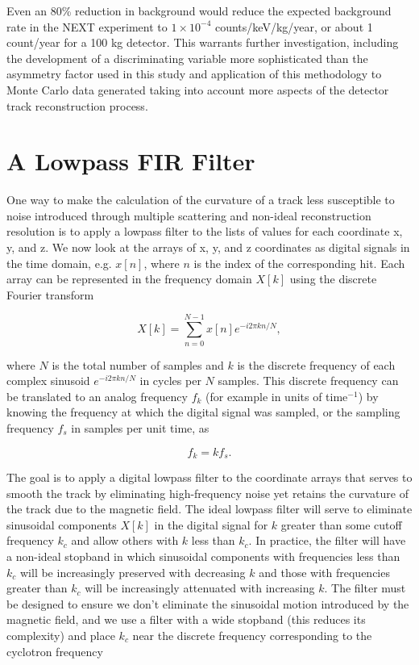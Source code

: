 \documentclass{JINST}
\begin{document}
Even an 80\% reduction in background would reduce the expected background rate in the NEXT experiment to
$1 \times 10^{-4}$ counts/keV/kg/year, or about 1 count/year for a 100 kg detector.  This warrants further
investigation, including the development of a discriminating variable more sophisticated than the asymmetry 
factor used in this study and application of this methodology to Monte Carlo data generated taking into account 
more aspects of the detector track reconstruction process.

\appendix

\section{A Lowpass FIR Filter}\label{app:FIR}
One way to make the calculation of the curvature of a track less susceptible to noise 
introduced through multiple scattering and non-ideal reconstruction resolution is to apply a lowpass filter to 
the lists of values for each coordinate x, y, and z.  We now look at the arrays of x, y, and z coordinates as digital 
signals in the time domain, e.g. $x[n]$, where $n$ is the index of the corresponding hit.  Each array can be 
represented in the frequency domain $X[k]$ using the discrete Fourier transform

\begin{equation}
X[k] = \sum_{n=0}^{N-1}x[n]e^{-i2\pi kn/N},
\end{equation}

\noindent where $N$ is the total number of samples and $k$ is the discrete frequency of each complex
sinusoid $e^{-i2\pi kn/N}$ in cycles per $N$ samples.  This discrete frequency can be translated to an analog
frequency $f_{k}$ (for example in units of time$^{-1}$) by knowing the frequency at which the digital signal was
sampled, or the sampling frequency $f_{s}$ in samples per unit time, as

\begin{equation}
f_{k} = kf_{s}.
\end{equation}

The goal is to apply a digital lowpass filter to the coordinate arrays that serves to
smooth the track by eliminating high-frequency noise yet retains the curvature of the track
due to the magnetic field.  The ideal lowpass filter will serve to eliminate sinusoidal components
$X[k]$ in the digital signal for $k$ greater than some cutoff frequency $k_{c}$ and allow 
others with $k$ less than $k_{c}$.  In practice, the filter will have a non-ideal stopband in which sinusoidal 
components with frequencies less than $k_{c}$ will be increasingly preserved with decreasing $k$ and those 
with frequencies greater than $k_{c}$ will be increasingly attenuated with increasing $k$.  The filter must be 
designed to ensure we don't eliminate the sinusoidal motion introduced by the magnetic field, and we use a
filter with a wide stopband (this reduces its complexity) and place $k_{c}$ near the discrete frequency 
corresponding to the cyclotron frequency
\end{document}
